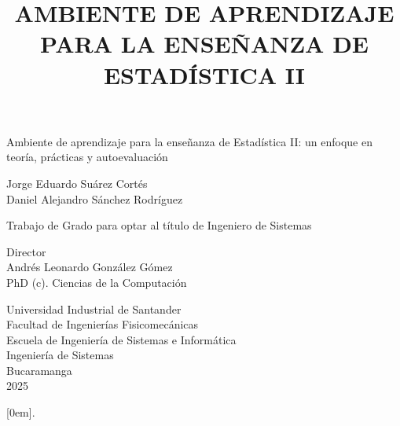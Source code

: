 \documentclass[letter,oneside,12pt,spanish]{report}
\begin{document}
\title{AMBIENTE DE APRENDIZAJE PARA LA ENSEÑANZA DE ESTADÍSTICA II}

\begin{center}

Ambiente de aprendizaje para la enseñanza de Estadística II: un enfoque en teoría, prácticas y autoevaluación\vspace{1.5cm}

Jorge Eduardo Suárez Cortés\\
Daniel Alejandro Sánchez Rodríguez \\ \vspace{1.5cm}

Trabajo de Grado para optar al título de Ingeniero de Sistemas\\ \vspace{1.5cm}

Director\\
Andrés Leonardo González Gómez\\
PhD (c). Ciencias de la Computación\vspace{1.5cm}


Universidad Industrial de Santander\\
Facultad de Ingenierías Fisicomecánicas\\
Escuela de Ingeniería de Sistemas e Informática\\
Ingeniería de Sistemas\\
Bucaramanga\\
2025\\

\end{center}


\parskip=0pt

\newpage

[0em]{\normalfont\normalsize}{\thecontentslabel. }{}{\titlerule*[1em]{}\contentspage}
\end{document}
